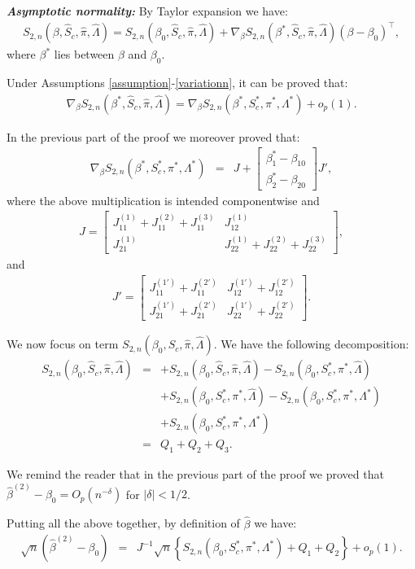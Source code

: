 \documentclass[11pt]{article}
\newcommand{\ee}{\end{eqnarray}}
\newcommand{\eqnn}{\begin{eqnarray*}}
\newcommand{\een}{\end{eqnarray*}}
\newcommand{\be}{\begin{eqnarray}}
\begin{document}
\textbf{\emph{Asymptotic normality:}}
By Taylor expansion we have:
\be
S_{2,n}({\beta}, \hat S_{c},  \hat \pi, \hat \Lambda)=S_{2,n}({\beta}_0, \hat S_c,  \hat \pi, \hat \Lambda)+\nabla_{{\beta}}S_{2,n}({\beta}^{*}, \hat S_c,  \hat \pi, \hat \Lambda)\left({\beta}-{\beta}_0\right)^\top,
\ee
where ${\beta}^{*}$ lies between ${\beta}$ and ${\beta}_0$.

Under Assumptions \ref{assumption}-\ref{variationn}, it can be proved that:
\be
\nabla_{{\beta}}S_{2,n}({\beta}^{*}, \hat S_c,  \hat \pi, \hat \Lambda)=\nabla_{{\beta}}S_{2,n}({\beta}^{*}, S^{*}_c,  \pi^{*}, \Lambda^{*})+o_p(1).
\ee

In the previous part of the proof we moreover proved that:
\eqnn
\nabla_{{\beta}}S_{2,n}({\beta}^{*}, S^{*}_c,  \pi^{*}, \Lambda^{*})&=&J+\begin{bmatrix} \beta^{*}_1-\beta_{10} \\ \beta^{*}_2-\beta_{20}\end{bmatrix}J',
\een
where the above multiplication is intended componentwise and
\eqnn
J=\begin{bmatrix} J^{(1)}_{11}+J^{(2)}_{11}+J^{(3)}_{11}& J^{(1)}_{12}\\
J^{(1)}_{21} & J^{(1)}_{22}+J^{(2)}_{22}+J^{(3)}_{22}
\end{bmatrix},
\een
and
\eqnn
J'=\begin{bmatrix} J^{(1')}_{11}+J^{(2')}_{11} & J^{(1')}_{12}+J^{(2')}_{12}\\
J^{(1')}_{21}+J^{(2')}_{21}& J^{(1')}_{22}+J^{(2')}_{22}
\end{bmatrix}.
\een

We now focus on term $S_{2,n}(\beta_0, \hat S_c, \hat \pi, \hat \Lambda)$.
We have the following decomposition:
\eqnn
S_{2,n}(\beta_0, \hat S_c, \hat \pi, \hat \Lambda)&=&+S_{2,n}(\beta_0, \hat S_c, \hat \pi, \hat \Lambda)-S_{2,n}(\beta_0, S^{*}_{c},  \pi^{*}, \hat \Lambda)\\
&&+S_{2,n}(\beta_0, S^{*}_{c},  \pi^{*}, \hat \Lambda)-S_{2,n}(\beta_0, S^{*}_{c},  \pi^{*}, \Lambda^{*})\\
&&+S_{2,n}(\beta_0, S^{*}_{c},  \pi^{*}, \Lambda^{*})\\
&=&Q_1+Q_2+Q_3.
\een

We remind the reader that in the previous part of the proof we proved that $\hat \beta^{(2)}-\beta_0=O_p(n^{-\delta})$ for $|\delta|<1/2$.

Putting all the above together, by definition of $\hat \beta$ we have:
\be\label{decosc1}
\sqrt{n}(\hat \beta^{(2)}-\beta_0)&=&J^{-1}\sqrt{n}\left\{S_{2,n}(\beta_0, S^{*}_{c},  \pi^{*}, \Lambda^{*})+Q_1+Q_2\right\}+o_p(1).
\ee
\end{document}

